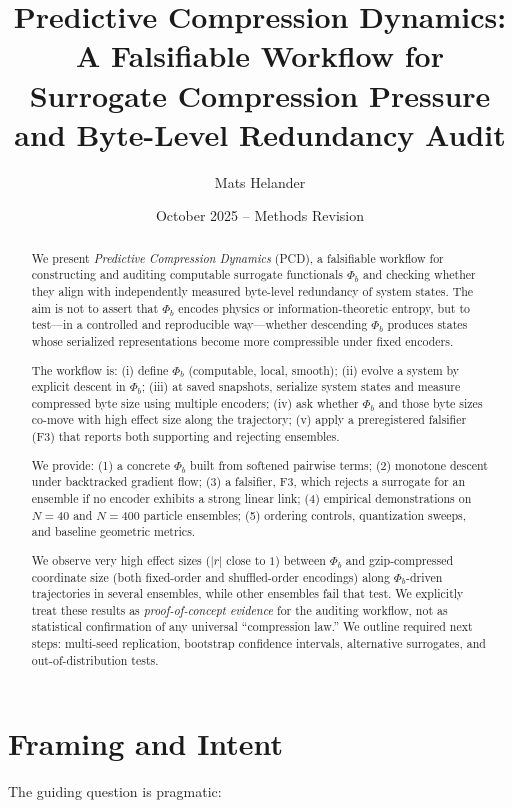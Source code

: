 \documentclass[11pt,a4paper]{article}
\title{\bf Predictive Compression Dynamics:\\
A Falsifiable Workflow for Surrogate Compression Pressure and Byte-Level Redundancy Audit}
\author{Mats Helander}
\date{October 2025 -- Methods Revision}
\numberwithin{equation}{section}
\newcommand{\phib}{\Phi_b}
\begin{document}
\maketitle

\begin{abstract}
We present \emph{Predictive Compression Dynamics} (PCD), a falsifiable workflow for constructing and auditing computable surrogate functionals $\phib$ and checking whether they align with independently measured byte-level redundancy of system states. The aim is not to assert that $\phib$ encodes physics or information-theoretic entropy, but to test—in a controlled and reproducible way—whether descending $\phib$ produces states whose serialized representations become more compressible under fixed encoders.

The workflow is: (i) define $\phib$ (computable, local, smooth); (ii) evolve a system by explicit descent in $\phib$; (iii) at saved snapshots, serialize system states and measure compressed byte size using multiple encoders; (iv) ask whether $\phib$ and those byte sizes co-move with high effect size along the trajectory; (v) apply a preregistered falsifier (F3) that reports both supporting and rejecting ensembles.

We provide: (1) a concrete $\phib$ built from softened pairwise terms; (2) monotone descent under backtracked gradient flow; (3) a falsifier, F3, which rejects a surrogate for an ensemble if no encoder exhibits a strong linear link; (4) empirical demonstrations on $N{=}40$ and $N{=}400$ particle ensembles; (5) ordering controls, quantization sweeps, and baseline geometric metrics.

We observe very high effect sizes ($|r|$ close to $1$) between $\phib$ and gzip-compressed coordinate size (both fixed-order and shuffled-order encodings) along $\phib$-driven trajectories in several ensembles, while other ensembles fail that test. We explicitly treat these results as \emph{proof-of-concept evidence} for the auditing workflow, not as statistical confirmation of any universal “compression law.” We outline required next steps: multi-seed replication, bootstrap confidence intervals, alternative surrogates, and out-of-distribution tests.
\end{abstract}

\section{Framing and Intent}
The guiding question is pragmatic:
\end{document}
